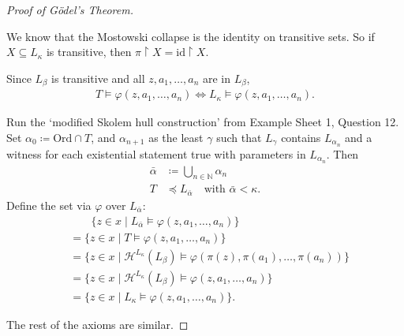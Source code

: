 \documentclass{article}
\newcommand{\1}{\mathbbm{1}}
\DeclareMathOperator{\tcl}{tcl}
\let\models\vDash
\begin{document}
\begin{proof}[Proof of G\"odel's Theorem]
\begin{description}
    We know that the Mostowski collapse is the identity on transitive sets. So if $X \subseteq L_\kappa$ is transitive, then $\pi \upharpoonright X = \text{id} \upharpoonright X$.

    Since $L_\beta$ is transitive and all $z, a_1, \dotsc, a_n$ are in $L_\beta$,
    \begin{align*}
      T \models \varphi(z,a_1, \dotsc, a_n) \iff L_\kappa \models \varphi(z,a_1, \dotsc, a_n).
    \end{align*}

    Run the `modified Skolem hull construction' from Example Sheet 1, Question 12.
    Set $\alpha_0 \coloneqq \text{Ord} \cap T$, and $\alpha_{n+1}$ as the least $\gamma$ such that $L_\gamma$ contains $L_{\alpha_n}$ and a witness for each existential statement true with parameters in $L_{\alpha_n}$.
    Then
    \begin{align*}
      \bar{\alpha} &\coloneqq \bigcup_{n \in \mathbb{N}} \alpha_{n} \\
      T &\preccurlyeq L_{\bar{\alpha}} \quad \text{with } \bar{\alpha} < \kappa.
    \end{align*}
    Define the set via $\varphi$ over $L_{\bar{\alpha}}$:
    \begin{align*}
      &\phantom{=}\,\ \ \!\!\{z \in x \mid L_{\bar{\alpha}} \models \varphi(z,a_1,\dotsc,a_n)\} \\
      &=\{z \in x \mid T \models \varphi(z,a_1,\dotsc,a_n)\} \\
      &=\{z \in x \mid \mathcal{H}^{L_\kappa}(L_\beta) \models \varphi(\pi(z),\pi(a_1),\dotsc,\pi(a_n))\} \\
      &=\{z \in x \mid \mathcal{H}^{L_\kappa}(L_\beta) \models \varphi(z,a_1,\dotsc,a_n)\} \\
      &=\{z \in x \mid L_\kappa \models \varphi(z,a_1,\dotsc,a_n)\}.
    \end{align*}
  \end{description}
  The rest of the axioms are similar.
\end{proof}
\end{document}
